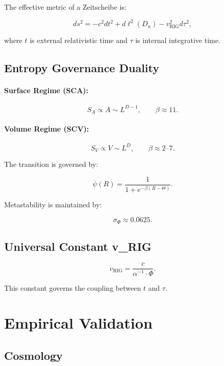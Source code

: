 \documentclass[11pt,a4paper]{article}
\begin{document}
The effective metric of a Zeitscheibe is:


\[
ds^2 = -c^2 dt^2 + d\ell^2(D_n) - v_{\text{RIG}}^2 d\tau^2,
\]


where $t$ is external relativistic time and $\tau$ is internal integrative time.

\subsection{Entropy Governance Duality}

\paragraph{Surface Regime (SCA):}


\[
S_A \propto A \sim L^{D-1}, \qquad \beta \approx 11.
\]



\paragraph{Volume Regime (SCV):}


\[
S_V \propto V \sim L^{D}, \qquad \beta \approx 2\text{--}7.
\]



The transition is governed by:


\[
\psi(R) = \frac{1}{1 + e^{-\beta(R - \Theta)}}.
\]



Metastability is maintained by:


\[
\sigma_{\Phi} \approx 0.0625.
\]



\subsection{Universal Constant v\_RIG}



\[
v_{\text{RIG}} = \frac{c}{\alpha^{-1} \cdot \Phi}.
\]



This constant governs the coupling between $t$ and $\tau$.

\section{Empirical Validation}

\subsection{Cosmology}
\end{document}
